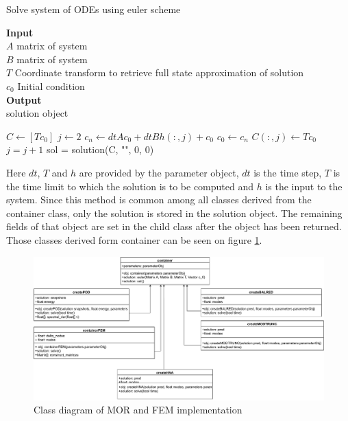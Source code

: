 \begin{algorithm}[H]
\caption{Solve system of ODEs using euler scheme}
\textbf{Input} \\
 \hspace*{\algorithmicindent} $A$ matrix of system \\
 \hspace*{\algorithmicindent} $B$ matrix of system \\
 \hspace*{\algorithmicindent} $T$ Coordinate transform to retrieve full state approximation of solution \\
 \hspace*{\algorithmicindent} $c_0$ Initial condition \\
 \textbf{Output} \\
 \hspace*{\algorithmicindent} solution object
\begin{algorithmic}[1]
\State $C \gets [Tc_0]$
\State $j \gets 2$
\State $c_n \gets dt A c_0 + dt B h(:, j) + c_0$
\State $c_0 \gets c_n$
\State $C(:, j) \gets T c_0$
\State $j = j+1$
\EndFor 
\State sol = solution(C, "", 0, 0)
\EndProcedure
\end{algorithmic}
\end{algorithm}
Here \(dt\), \(T\) and \(h\) are provided by the parameter object,
\(dt\) is the time step, \(T\) is the time limit to which the solution is to be computed and \(h\) is the input to the system.
Since this method is common among all classes derived from the container class, only the solution is stored in the solution object.
The remaining fields of that object are set in the child class after the object has been returned.
Those classes derived form container can be seen on figure \ref{fig-class-2}.
\begin{figure}[H]
\includegraphics[width=\textwidth]{images/container}
\caption{Class diagram of MOR and FEM implementation}
\label{fig-class-2}
\end{figure}

